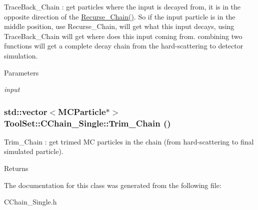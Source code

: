TraceBack\_\-Chain : get particles where the input is decayed from, it is in the opposite direction of the \hyperlink{classToolSet_1_1CChain__Single_a6e24f84cd12c38d28f4e154f547d4170}{Recurse\_\-Chain()}. So if the input particle is in the middle position, use Recurse\_\-Chain, will get what this input decays, using TraceBack\_\-Chain will get where does this input coming from. combining two functions will get a complete decay chain from the hard-\/scattering to detector simulation.


\begin{DoxyParams}{Parameters}
\item[{\em input}]\end{DoxyParams}
\hypertarget{classToolSet_1_1CChain__Single_a8323cc6a1a9f5dd2ef0527324e9140c9}{
\subsubsection[{Trim\_\-Chain}]{\setlength{\rightskip}{0pt plus 5cm}std::vector$<$MCParticle$\ast$$>$ ToolSet::CChain\_\-Single::Trim\_\-Chain ()}}
\label{classToolSet_1_1CChain__Single_a8323cc6a1a9f5dd2ef0527324e9140c9}


Trim\_\-Chain : get trimed MC particles in the chain (from hard-\/scattering to final simulated particle). \begin{DoxyReturn}{Returns}

\end{DoxyReturn}


The documentation for this class was generated from the following file:\begin{DoxyCompactItemize}
\item 
CChain\_\-Single.h\end{DoxyCompactItemize}
